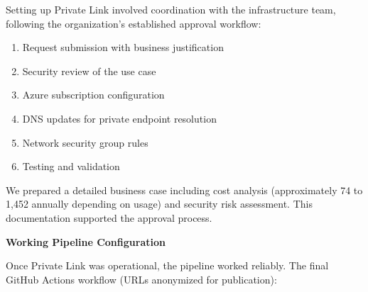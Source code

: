 Setting up Private Link involved coordination with the infrastructure team, following the organization's established approval workflow:

\begin{enumerate}
    \item Request submission with business justification
    \item Security review of the use case
    \item Azure subscription configuration
    \item DNS updates for private endpoint resolution
    \item Network security group rules
    \item Testing and validation
\end{enumerate}

We prepared a detailed business case including cost analysis (approximately \texteuro{}74 to \texteuro{}1,452 annually depending on usage) and security risk assessment. This documentation supported the approval process.

\textbf{Working Pipeline Configuration}

Once Private Link was operational, the pipeline worked reliably. The final GitHub Actions workflow (URLs anonymized for publication):

